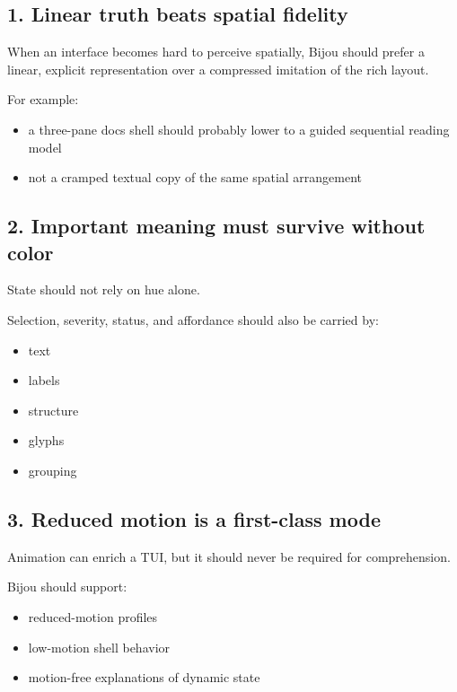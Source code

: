 \subsection{1. Linear truth beats spatial fidelity}\label{record-032-linear-truth-beats-spatial-fidelity}

When an interface becomes hard to perceive spatially, Bijou should prefer a linear, explicit representation over a compressed imitation of the rich layout.

For example:

\begin{itemize}
\tightlist
\item
  a three-pane docs shell should probably lower to a guided sequential reading model
\item
  not a cramped textual copy of the same spatial arrangement
\end{itemize}

\subsection{2. Important meaning must survive without color}\label{record-032-important-meaning-must-survive-without-color}

State should not rely on hue alone.

Selection, severity, status, and affordance should also be carried by:

\begin{itemize}
\tightlist
\item
  text
\item
  labels
\item
  structure
\item
  glyphs
\item
  grouping
\end{itemize}

\subsection{3. Reduced motion is a first-class mode}\label{record-032-reduced-motion-is-a-first-class-mode}

Animation can enrich a TUI, but it should never be required for comprehension.

Bijou should support:

\begin{itemize}
\tightlist
\item
  reduced-motion profiles
\item
  low-motion shell behavior
\item
  motion-free explanations of dynamic state
\end{itemize}

